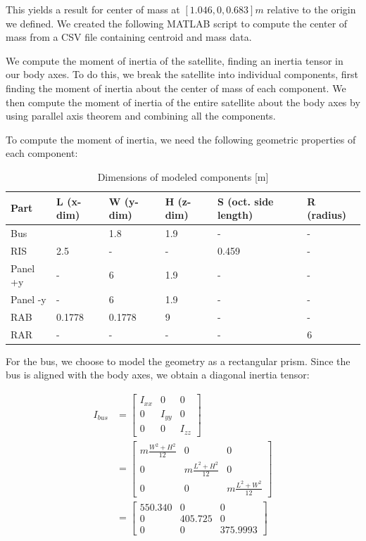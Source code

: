 This yields a result for center of mass at $[1.046, 0, 0.683] m$ relative to the origin we defined. We created the following MATLAB script to compute the center of mass from a CSV file containing centroid and mass data.



We compute the moment of inertia of the satellite, finding an inertia tensor in our body axes. To do this, we break the satellite into individual components, first finding the moment of inertia about the center of mass of each component. We then compute the moment of inertia of the entire satellite about the body axes by using parallel axis theorem and combining all the components.

To compute the moment of inertia, we need the following geometric properties of each component:

\begin{longtable}{l|l|l|l|l|l}
\caption{Dimensions of modeled components [m]}
\label{tab:dimensions}\\
\textbf{Part} & \textbf{L (x-dim)} & \textbf{W (y-dim)} & \textbf{H (z-dim)} & \textbf{S (oct. side length)} & \textbf{R (radius)} \\ \hline
\endfirsthead
%
\endhead
%
Bus &  & 1.8 & 1.9 & - & - \\
RIS & 2.5 & - & - & 0.459 & - \\
Panel +y & - & 6 & 1.9 & - & - \\
Panel -y & - & 6 & 1.9 & - & - \\
RAB & 0.1778 & 0.1778 & 9 & - & - \\
RAR & - & - & - & - & 6
\end{longtable}

For the bus, we choose to model the geometry as a rectangular prism. Since the bus is aligned with the body axes, we obtain a diagonal inertia tensor:

\begin{align*}
I_{bus} &=
\begin{bmatrix}
I_{xx} & 0 & 0 \\
0 & I_{yy} & 0 \\
0 & 0 & I_{zz}
\end{bmatrix} \\
&=
\begin{bmatrix}
m \frac{W^{2} + H^{2}}{12} & 0 & 0 \\
0 & m \frac{L^{2} + H^{2}}{12} & 0 \\
0 & 0 & m \frac{L^{2} + W^{2}}{12} 
\end{bmatrix} \\
&=
\begin{bmatrix}
550.340 & 0 & 0 \\
0 & 405.725 & 0 \\
0 & 0 & 375.9993 
\end{bmatrix}
\end{align*}

